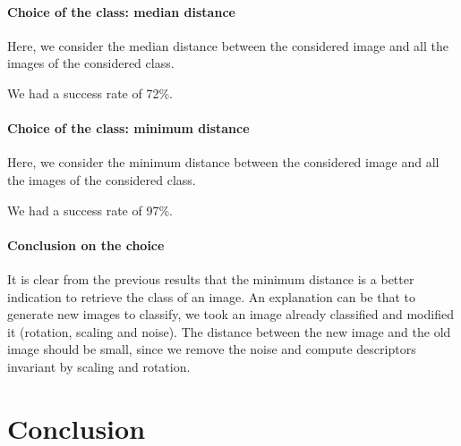 \documentclass[a4paper,12pt]{article}
\theoremstyle{example}
\theoremstyle{remark}
\theoremstyle{definition}
\begin{document}
\paragraph{Choice of the class: median distance}

Here, we consider the median distance between the considered image and all the images of the considered class.

We had a success rate of 72\%.

\paragraph{Choice of the class: minimum distance}

Here, we consider the minimum distance between the considered image and all the images of the considered class.

We had a success rate of 97\%.

\paragraph{Conclusion on the choice}

It is clear from the previous results that the minimum distance is a better indication to retrieve the class of an image. An explanation can be that to generate new images to classify, we took an image already classified and modified it (rotation, scaling and noise). The distance between the new image and the old image should be small, since we remove the noise and compute descriptors invariant by scaling and rotation.


\section{Conclusion}
\end{document}

